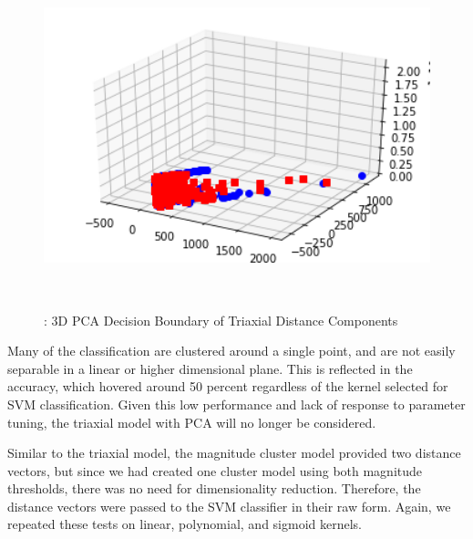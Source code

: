 \documentclass{llncs}
\begin{document}
\begin{figure}
	\centering
	\includegraphics[width=12cm, height=10cm]{images/Classification/3D_PCA.png} 
	\caption{: 3D PCA Decision Boundary of Triaxial Distance Components}
	\label{Figure 2: 3D Plot of Linear Kernel SVM with Triaxial Distance Components}
\end{figure}    


	Many of the classification are clustered around a single point, and are not easily separable in a linear or higher dimensional plane. This is reflected in the accuracy, which hovered around 50 percent regardless of the kernel selected for SVM classification. Given this low performance and lack of response to parameter tuning, the triaxial model with PCA will no longer be considered. 

    Similar to the triaxial model, the magnitude cluster model provided two distance vectors, but since we had created one cluster model using both magnitude thresholds, there was no need for dimensionality reduction. Therefore, the distance vectors were passed to the SVM classifier in their raw form. Again, we repeated these tests on linear, polynomial, and sigmoid kernels. 
    
 
\end{document}
